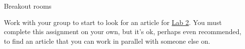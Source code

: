 \documentclass[table]{beamer}\usepackage[]{graphicx}\usepackage[]{color}
\begin{document}

\begin{frame}[fragile]{Breakout rooms}

Work with your group to start to look for an article for \href{https://moodle.umass.edu/pluginfile.php/3739605/mod_assign/introattachment/0/lab2-blog.pdf?forcedownload=1}{Lab 2}. You must complete this assignment on your own, but it's ok, perhaps even recommended, to find an article that you can work in parallel with someone else on. 

\end{frame}







\end{document}
